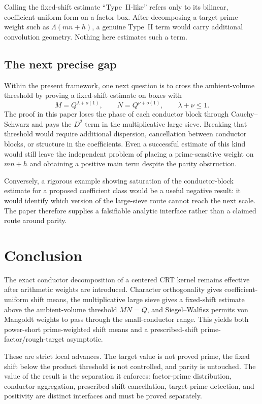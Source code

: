 Calling the fixed-shift estimate ``Type~II-like'' refers only to its bilinear, coefficient-uniform form on a factor box.  After decomposing a target-prime weight such as $\Lambda(mn+h)$, a genuine Type~II term would carry additional convolution geometry.  Nothing here estimates such a term.

\subsection{The next precise gap}

Within the present framework, one next question is to cross the ambient-volume threshold by proving a fixed-shift estimate on boxes with
\[
 M=Q^{\lambda+o(1)},
 \qquad
 N=Q^{\nu+o(1)},
 \qquad
 \lambda+\nu\le1.
\]
The proof in this paper loses the phase of each conductor block through Cauchy--Schwarz and pays the $D^2$ term in the multiplicative large sieve.  Breaking that threshold would require additional dispersion, cancellation between conductor blocks, or structure in the coefficients.  Even a successful estimate of this kind would still leave the independent problem of placing a prime-sensitive weight on $mn+h$ and obtaining a positive main term despite the parity obstruction.

Conversely, a rigorous example showing saturation of the conductor-block estimate for a proposed coefficient class would be a useful negative result: it would identify which version of the large-sieve route cannot reach the next scale.  The paper therefore supplies a falsifiable analytic interface rather than a claimed route around parity.

\section{Conclusion}\label{sec:conclusion}

The exact conductor decomposition of a centered CRT kernel remains effective after arithmetic weights are introduced.  Character orthogonality gives coefficient-uniform shift means, the multiplicative large sieve gives a fixed-shift estimate above the ambient-volume threshold $MN=Q$, and Siegel--Walfisz permits von Mangoldt weights to pass through the small-conductor range.  This yields both power-short prime-weighted shift means and a prescribed-shift prime-factor/rough-target asymptotic.

These are strict local advances.  The target value is not proved prime, the fixed shift below the product threshold is not controlled, and parity is untouched.  The value of the result is the separation it enforces: factor-prime distribution, conductor aggregation, prescribed-shift cancellation, target-prime detection, and positivity are distinct interfaces and must be proved separately.

